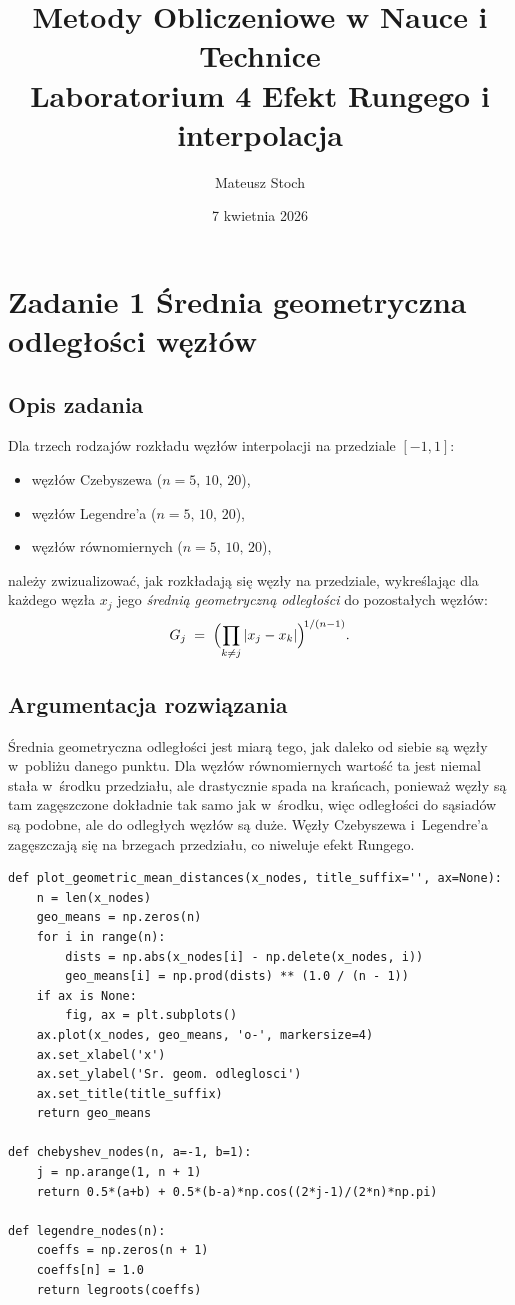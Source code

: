 \documentclass[12pt, a4paper]{article}
\title{
  \textbf{Metody Obliczeniowe w Nauce i Technice} \\[0.5em]
  \large Laboratorium 4 \textemdash{} Efekt Rungego i interpolacja
}
\author{Mateusz Stoch}
\date{7 kwietnia 2026}
\begin{document}
\maketitle

\section{Zadanie 1 \textemdash{} Średnia geometryczna odległości węzłów}

\subsection{Opis zadania}

Dla trzech rodzajów rozkładu węzłów interpolacji na przedziale $[-1,1]$:
\begin{itemize}
  \item węzłów Czebyszewa ($n = 5,\, 10,\, 20$),
  \item węzłów Legendre'a ($n = 5,\, 10,\, 20$),
  \item węzłów równomiernych ($n = 5,\, 10,\, 20$),
\end{itemize}
należy zwizualizować, jak rozkładają się węzły na przedziale, wykreślając
dla każdego węzła $x_j$ jego \emph{średnią geometryczną odległości} do
pozostałych węzłów:
\[
  G_j \;=\; \Bigl(\prod_{k \neq j} |x_j - x_k|\Bigr)^{\!1/(n-1)}.
\]

\subsection{Argumentacja rozwiązania}

Średnia geometryczna odległości jest miarą tego, jak daleko od siebie
są węzły w~pobliżu danego punktu. Dla węzłów równomiernych wartość ta
jest niemal stała w~środku przedziału, ale drastycznie spada na
krańcach, ponieważ węzły są tam zagęszczone dokładnie tak samo jak w~środku,
więc odległości do sąsiadów są podobne, ale do odległych węzłów są duże.
Węzły Czebyszewa i~Legendre'a zagęszczają się na brzegach przedziału, co
niweluje efekt Rungego.
\newpage
\begin{lstlisting}[caption={Obliczanie i wizualizacja średniej geometrycznej odległości}]
def plot_geometric_mean_distances(x_nodes, title_suffix='', ax=None):
    n = len(x_nodes)
    geo_means = np.zeros(n)
    for i in range(n):
        dists = np.abs(x_nodes[i] - np.delete(x_nodes, i))
        geo_means[i] = np.prod(dists) ** (1.0 / (n - 1))
    if ax is None:
        fig, ax = plt.subplots()
    ax.plot(x_nodes, geo_means, 'o-', markersize=4)
    ax.set_xlabel('x')
    ax.set_ylabel('Sr. geom. odleglosci')
    ax.set_title(title_suffix)
    return geo_means

def chebyshev_nodes(n, a=-1, b=1):
    j = np.arange(1, n + 1)
    return 0.5*(a+b) + 0.5*(b-a)*np.cos((2*j-1)/(2*n)*np.pi)

def legendre_nodes(n):
    coeffs = np.zeros(n + 1)
    coeffs[n] = 1.0
    return legroots(coeffs)
\end{lstlisting}
\end{document}
